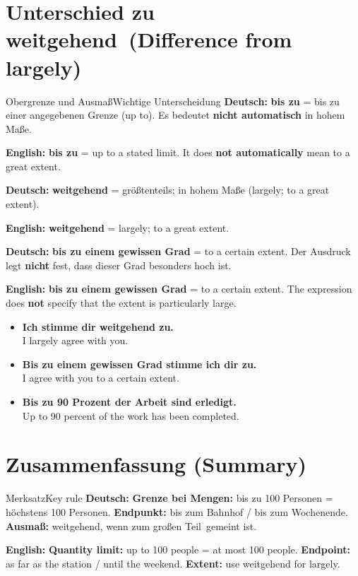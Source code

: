 \documentclass[a4paper,11pt]{article}
\newcommand{\GermanText}[1]{\textbf{Deutsch: }#1\par}
\newcommand{\EnglishText}[1]{{\small\color{SoftGray}\textbf{English: }#1\par}}
\newcommand{\ExampleItem}[2]{\item \textbf{#1}\\{\small\color{SoftGray}#2}}
\begin{document}
   \section{Unterschied zu \glqq weitgehend\grqq\ (Difference from largely)}
      \begin{grammarentry}{Obergrenze und Ausmaß}{Wichtige Unterscheidung}
         \GermanText{\textbf{bis zu} = bis zu einer angegebenen Grenze (up to). Es bedeutet \textbf{nicht automatisch} \glqq in hohem Maße\grqq.}
         \EnglishText{\textbf{bis zu} = up to a stated limit. It does \textbf{not automatically} mean to a great extent.}
         \GermanText{\textbf{weitgehend} = größtenteils; in hohem Maße (largely; to a great extent).}
         \EnglishText{\textbf{weitgehend} = largely; to a great extent.}
         \GermanText{\textbf{bis zu einem gewissen Grad} = to a certain extent. Der Ausdruck legt \textbf{nicht} fest, dass dieser Grad besonders hoch ist.}
         \EnglishText{\textbf{bis zu einem gewissen Grad} = to a certain extent. The expression does \textbf{not} specify that the extent is particularly large.}
      \end{grammarentry}
      \begin{exbox}
         \begin{itemize}
            \ExampleItem{Ich stimme dir weitgehend zu.}{I largely agree with you.}
            \ExampleItem{Bis zu einem gewissen Grad stimme ich dir zu.}{I agree with you to a certain extent.}
            \ExampleItem{Bis zu 90 Prozent der Arbeit sind erledigt.}{Up to 90 percent of the work has been completed.}
         \end{itemize}
      \end{exbox}

   \section{Zusammenfassung (Summary)}
      \begin{grammarentry}{Merksatz}{Key rule}
         \GermanText{\textbf{Grenze bei Mengen:} bis zu 100 Personen = höchstens 100 Personen. \textbf{Endpunkt:} bis zum Bahnhof / bis zum Wochenende. \textbf{Ausmaß:} weitgehend, wenn \glqq zum großen Teil\grqq\ gemeint ist.}
         \EnglishText{\textbf{Quantity limit:} up to 100 people = at most 100 people. \textbf{Endpoint:} as far as the station / until the weekend. \textbf{Extent:} use weitgehend for largely.}
      \end{grammarentry}
\end{document}
